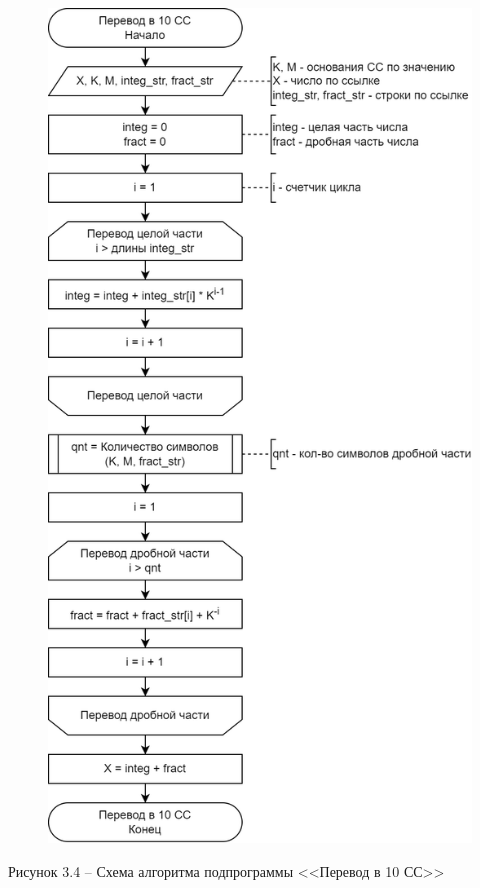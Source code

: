 \documentclass[a4paper,14pt]{extarticle}
\begin{document}
	\begin{figure}[h]
		\centering
		\includegraphics[width=0.59\linewidth]{schemes/s-3-4}
	\end{figure}
	\begin{center}
		Рисунок 3.4 – Схема алгоритма подпрограммы <<Перевод в 10 СС>>
	\end{center}
	\pagebreak
	
\end{document}
